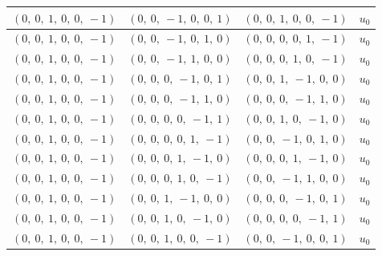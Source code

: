 \documentclass[11pt]{article}
\theoremstyle{definition}
\begin{document}
\begin{longtable}{|l|l|l|c|}
    \hline
    $\left( 0, \  0, \  1, \  0, \  0, \  -1\right)$ & $\left( 0, \  0, \  -1, \  0, \  0, \  1\right)$ & $\left( 0, \  0, \  1, \  0, \  0, \  -1\right)$ & $u_{0}$ \\
    \hline
    $\left( 0, \  0, \  1, \  0, \  0, \  -1\right)$ & $\left( 0, \  0, \  -1, \  0, \  1, \  0\right)$ & $\left( 0, \  0, \  0, \  0, \  1, \  -1\right)$ & $u_{0}$ \\
    \hline
    $\left( 0, \  0, \  1, \  0, \  0, \  -1\right)$ & $\left( 0, \  0, \  -1, \  1, \  0, \  0\right)$ & $\left( 0, \  0, \  0, \  1, \  0, \  -1\right)$ & $u_{0}$ \\
    \hline
    $\left( 0, \  0, \  1, \  0, \  0, \  -1\right)$ & $\left( 0, \  0, \  0, \  -1, \  0, \  1\right)$ & $\left( 0, \  0, \  1, \  -1, \  0, \  0\right)$ & $u_{0}$ \\
    \hline
    $\left( 0, \  0, \  1, \  0, \  0, \  -1\right)$ & $\left( 0, \  0, \  0, \  -1, \  1, \  0\right)$ & $\left( 0, \  0, \  0, \  -1, \  1, \  0\right)$ & $u_{0}$ \\
    \hline
    $\left( 0, \  0, \  1, \  0, \  0, \  -1\right)$ & $\left( 0, \  0, \  0, \  0, \  -1, \  1\right)$ & $\left( 0, \  0, \  1, \  0, \  -1, \  0\right)$ & $u_{0}$ \\
    \hline
    $\left( 0, \  0, \  1, \  0, \  0, \  -1\right)$ & $\left( 0, \  0, \  0, \  0, \  1, \  -1\right)$ & $\left( 0, \  0, \  -1, \  0, \  1, \  0\right)$ & $u_{0}$ \\
    \hline
    $\left( 0, \  0, \  1, \  0, \  0, \  -1\right)$ & $\left( 0, \  0, \  0, \  1, \  -1, \  0\right)$ & $\left( 0, \  0, \  0, \  1, \  -1, \  0\right)$ & $u_{0}$ \\
    \hline
    $\left( 0, \  0, \  1, \  0, \  0, \  -1\right)$ & $\left( 0, \  0, \  0, \  1, \  0, \  -1\right)$ & $\left( 0, \  0, \  -1, \  1, \  0, \  0\right)$ & $u_{0}$ \\
    \hline
    $\left( 0, \  0, \  1, \  0, \  0, \  -1\right)$ & $\left( 0, \  0, \  1, \  -1, \  0, \  0\right)$ & $\left( 0, \  0, \  0, \  -1, \  0, \  1\right)$ & $u_{0}$ \\
    \hline
    $\left( 0, \  0, \  1, \  0, \  0, \  -1\right)$ & $\left( 0, \  0, \  1, \  0, \  -1, \  0\right)$ & $\left( 0, \  0, \  0, \  0, \  -1, \  1\right)$ & $u_{0}$ \\
    \hline
    $\left( 0, \  0, \  1, \  0, \  0, \  -1\right)$ & $\left( 0, \  0, \  1, \  0, \  0, \  -1\right)$ & $\left( 0, \  0, \  -1, \  0, \  0, \  1\right)$ & $u_{0}$ \\

\end{longtable}
\end{document}
